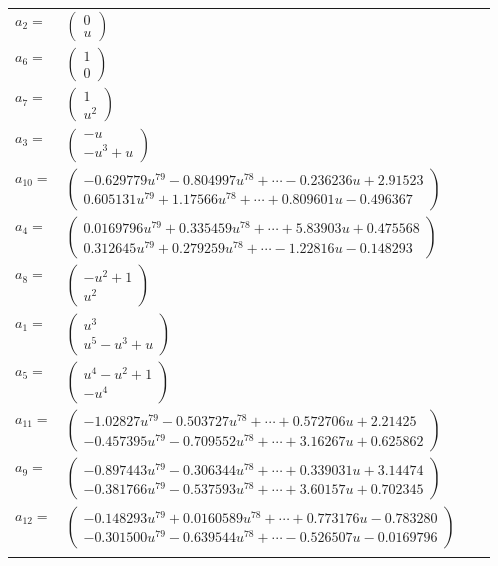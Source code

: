 \documentclass[1p]{elsarticle_modified}
\theoremstyle{definition}
\begin{document}
\begin{tabular}{m{7pt} m{180pt} m{7pt} m{180pt} }
\flushright $a_{2}=$&$\begin{pmatrix}0\\u\end{pmatrix}$ \\
\flushright $a_{6}=$&$\begin{pmatrix}1\\0\end{pmatrix}$ \\
\flushright $a_{7}=$&$\begin{pmatrix}1\\u^2\end{pmatrix}$ \\
\flushright $a_{3}=$&$\begin{pmatrix}- u\\- u^3+u\end{pmatrix}$ \\
\flushright $a_{10}=$&$\begin{pmatrix}-0.629779 u^{79}-0.804997 u^{78}+\cdots-0.236236 u+2.91523\\0.605131 u^{79}+1.17566 u^{78}+\cdots+0.809601 u-0.496367\end{pmatrix}$ \\
\flushright $a_{4}=$&$\begin{pmatrix}0.0169796 u^{79}+0.335459 u^{78}+\cdots+5.83903 u+0.475568\\0.312645 u^{79}+0.279259 u^{78}+\cdots-1.22816 u-0.148293\end{pmatrix}$ \\
\flushright $a_{8}=$&$\begin{pmatrix}- u^2+1\\u^2\end{pmatrix}$ \\
\flushright $a_{1}=$&$\begin{pmatrix}u^3\\u^5- u^3+u\end{pmatrix}$ \\
\flushright $a_{5}=$&$\begin{pmatrix}u^4- u^2+1\\- u^4\end{pmatrix}$ \\
\flushright $a_{11}=$&$\begin{pmatrix}-1.02827 u^{79}-0.503727 u^{78}+\cdots+0.572706 u+2.21425\\-0.457395 u^{79}-0.709552 u^{78}+\cdots+3.16267 u+0.625862\end{pmatrix}$ \\
\flushright $a_{9}=$&$\begin{pmatrix}-0.897443 u^{79}-0.306344 u^{78}+\cdots+0.339031 u+3.14474\\-0.381766 u^{79}-0.537593 u^{78}+\cdots+3.60157 u+0.702345\end{pmatrix}$ \\
\flushright $a_{12}=$&$\begin{pmatrix}-0.148293 u^{79}+0.0160589 u^{78}+\cdots+0.773176 u-0.783280\\-0.301500 u^{79}-0.639544 u^{78}+\cdots-0.526507 u-0.0169796\end{pmatrix}$\\&\end{tabular}
\end{document}
